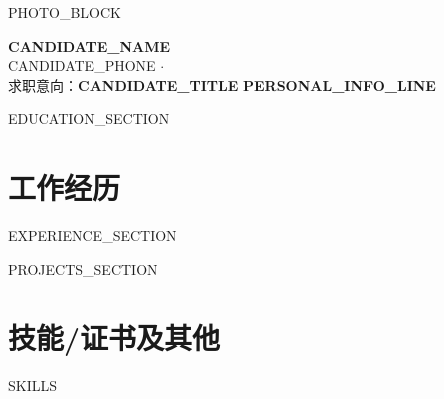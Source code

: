 \documentclass[11pt, a4paper]{article}
\begin{document}
{{PHOTO_BLOCK}}

\begin{center}
{\LARGE\bfseries {{CANDIDATE_NAME}}} \\[4pt]
\small\sloppy
{{CANDIDATE_PHONE}} \enspace $\cdot$  \\[2pt]
\small\sloppy
求职意向：\textbf{{{CANDIDATE_TITLE}}}\allowbreak \enspace \textbf{\color{grayText} {{PERSONAL_INFO_LINE}}}
\normalsize
\end{center}

\vspace{2.5pt}


{{EDUCATION_SECTION}}

\section{工作经历}
{{EXPERIENCE_SECTION}}

{{PROJECTS_SECTION}}


\section{技能/证书及其他}
{{SKILLS}}
\end{document}
